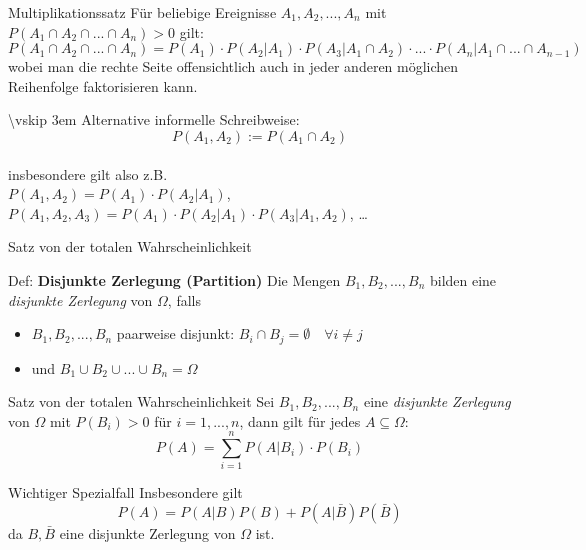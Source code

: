 \documentclass[
  10pt,
  ignorenonframetext,
]{beamer}
\providecommand{\tightlist}{%
  \setlength{\itemsep}{0pt}\setlength{\parskip}{0pt}}
\begin{document}
\begin{frame}{Multiplikationssatz}
\label{multiplikationssatz}
Für beliebige Ereignisse \(A_1, A_2, ..., A_n\) mit
\(P(A_1 \cap A_2 \cap ... \cap A_n) > 0\) gilt:
\[ P(A_1 \cap A_2 \cap ... \cap A_n) = P(A_1)\cdot P(A_2|A_1) \cdot P(A_3|A_1 \cap A_2) \cdot ... \cdot P(A_n|A_1 \cap ... \cap A_{n-1})\]
wobei man die rechte Seite offensichtlich auch in jeder anderen
möglichen Reihenfolge faktorisieren kann.

\textbackslash vskip 3em \small Alternative informelle Schreibweise:\\
\[P(A_1, A_2) := P(A_1 \cap A_2)\]\\
insbesondere gilt also z.B.\\
\(P(A_1 , A_2)  =  P(A_1)\cdot P(A_2|A_1)\),\\
\(P(A_1 , A_2 , A_3) = P(A_1)\cdot P(A_2|A_1) \cdot P(A_3|A_1, A_2)\),
\ldots{}

\end{frame}

\begin{frame}{Satz von der totalen Wahrscheinlichkeit}
\label{satz-von-der-totalen-wahrscheinlichkeit}
\begin{block}{Def: \textbf{Disjunkte Zerlegung (Partition)}}
\label{def-disjunkte-zerlegung-partition}
Die Mengen \(B_1, B_2, ..., B_n\) bilden eine \emph{disjunkte Zerlegung}
von \(\Omega\), falls

\begin{itemize}
\tightlist
\item
  \(B_1, B_2, ..., B_n\) paarweise disjunkt:
  \(B_i \cap B_j = \emptyset \quad \forall i \neq j\)
\item
  und \(B_1 \cup B_2 \cup ... \cup B_n = \Omega\)
\end{itemize}
\end{block}

\begin{block}{Satz von der totalen Wahrscheinlichkeit}
\label{satz-von-der-totalen-wahrscheinlichkeit-1}
Sei \(B_1, B_2, ..., B_n\) eine \emph{disjunkte Zerlegung} von
\(\Omega\) mit \(P(B_i) > 0\) für \(i=1,..., n\), dann gilt für jedes
\(A \subseteq \Omega\): \[ P(A) = \sum_{i=1}^n P(A|B_i) \cdot P(B_i) \]
\end{block}
\end{frame}

\begin{frame}{Wichtiger Spezialfall}
\label{wichtiger-spezialfall}
Insbesondere gilt \[ P(A) = P(A|B)P(B) + P(A|\bar{B})P(\bar{B})\] da
\(B, \bar{B}\) eine disjunkte Zerlegung von \(\Omega\) ist.

\end{frame}
\end{document}
